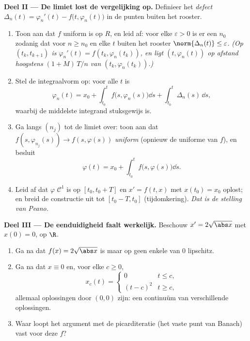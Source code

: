 \begin{problem}[{Weekendopgave --- bestaan van oplossingen van $x'
= f(t, x)$ zonder Lipschitz}]
\medskip
\noindent\textbf{Deel II --- De limiet lost de vergelijking op.}
Definieer het \emph{defect} $\Delta_n(t) = \varphi_n'(t) -
f\bigl(t, \varphi_n(t)\bigr)$ in de punten buiten het rooster.
\begin{enumerate}[resume]
  \item Toon aan dat $f$ uniform  is op $R$, en leid af:
        voor elke $\varepsilon > 0$ is er een $n_0$ zodanig dat
        voor $n \geq n_0$ en elke $t$ buiten het rooster
        $\norm{\Delta_n(t)} \leq \varepsilon$. \emph{(Op $(t_k,
        t_{k+1})$ is $\varphi_n'(t) = f(t_k, \varphi_n(t_k))$, en
        ligt $(t, \varphi_n(t))$ op afstand hoogstens $(1 +
        M)\,T/n$ van $(t_k, \varphi_n(t_k))$.)}
  \item Stel de integraalvorm op: voor alle $t$ is
        \[
        \varphi_n(t) = x_0 + \int_{t_0}^{t}
        f\bigl(s, \varphi_n(s)\bigr)\dd s +
        \int_{t_0}^t \Delta_n(s)\,\dd s,
        \]
        waarbij de middelste integrand stuksgewijs  is.
  \item Ga langs $(n_j)$ tot de limiet over: toon aan dat $f(s,
        \varphi_{n_j}(s)) \to f(s, \varphi(s))$ \emph{uniform}
        (opnieuw de uniforme  van $f$), en besluit
        \[
        \varphi(t) = x_0 + \int_{t_0}^t
        f\bigl(s, \varphi(s)\bigr)\dd s .
        \]
  \item Leid af dat $\varphi$ $\mathcal C^1$ is op $[t_0, t_0 +
        T]$ en $x' = f(t, x)$ met $x(t_0) = x_0$ oplost; en breid
        de constructie uit tot $[t_0 - T, t_0]$ (tijdomkering).
        \emph{Dat is de stelling van Peano.}
\end{enumerate}

\medskip
\noindent\textbf{Deel III --- De eenduidigheid faalt werkelijk.}
Beschouw $x' = 2\sqrt{\abs x}$ met $x(0) = 0$, op $\R$.
\begin{enumerate}[resume]
  \item Ga na dat $f(x) = 2\sqrt{\abs x}$  is maar op geen
        enkele  van $0$ lipschitz.
  \item Ga na dat $x \equiv 0$ en, voor elke $c \geq 0$,
        \[
        x_c(t) = \begin{cases} 0 & t \leq c,\\ (t - c)^2 & t
        \geq c,\end{cases}
        \]
        allemaal oplossingen door $(0,0)$ zijn: een continuüm van
        verschillende oplossingen.
  \item Waar loopt het argument met de picarditeratie (het vaste
        punt van Banach) vast voor deze $f$?
\end{enumerate}


\end{problem}
